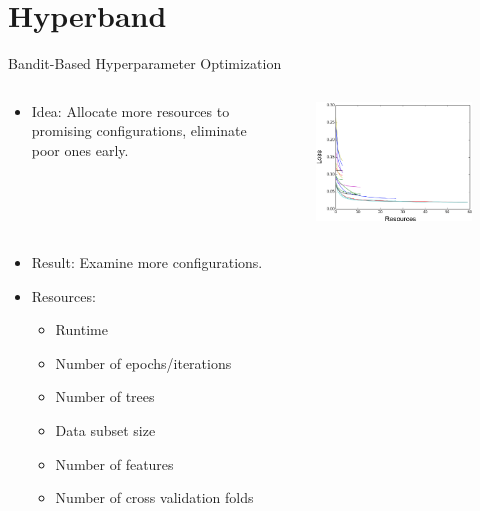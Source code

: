 \section{Hyperband}


\begin{frame}{Bandit-Based Hyperparameter Optimization}
\begin{columns}[T]

\begin{column}{.45\textwidth}
    \begin{itemize}
        \item Idea: Allocate more resources to promising configurations, eliminate poor ones early.
        \pause
    \end{itemize}
\end{column}
    \begin{column}{.45\linewidth}
    \begin{figure}
    \centering
    \includegraphics[width=0.9\linewidth]{w07_hpo_grey_box/images/hyperband/Figure_1_2.png}
\end{figure}
    \end{column}
    \end{columns}
    \begin{columns}
    
    \begin{column}{.45\linewidth}
    \vspace{-9em}
    \begin{itemize}
	\item Result: Examine more configurations.
	\pause
	\item Resources:
	\pause
	\begin{itemize}
	    \item Runtime
	    \pause
	    \item Number of epochs/iterations
	    \pause
	    \item Number of trees
	    \pause
	    \item Data subset size
	    \pause
	    \item Number of features
	    \pause
	    \item Number of cross validation folds
	    

\end{itemize}
\end{itemize}
\end{column}
\end{columns}
\end{frame}
